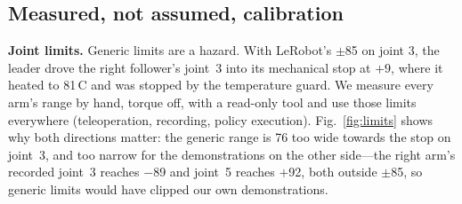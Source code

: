 \documentclass[10pt,twocolumn,letterpaper]{article}
\begin{document}
\subsection{Measured, not assumed, calibration}\label{sec:calib}
\textbf{Joint limits.} Generic limits are a hazard. With LeRobot's $\pm$85\textdegree{} on joint 3, the leader drove the
right follower's joint~3 into its mechanical stop at $+9$\textdegree{}, where it heated to 81\,\textdegree C and was
stopped by the temperature guard. We measure every arm's range by hand, torque off, with a read-only tool and use those
limits everywhere (teleoperation, recording, policy execution). Fig.~\ref{fig:limits} shows why both directions matter:
the generic range is 76\textdegree{} too wide towards the stop on joint~3, and too narrow for the demonstrations on the
other side---the right arm's recorded joint~3 reaches $-$89\textdegree{} and joint~5 reaches $+$92\textdegree, both
outside $\pm$85\textdegree, so generic limits would have clipped our own demonstrations.
\end{document}
